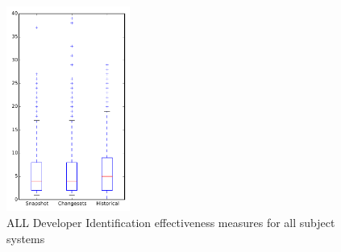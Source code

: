 
\begin{figure}[t]
\centering
\includegraphics[width=0.36\textwidth]{figures/dit/all_overview}
\caption{ALL Developer Identification effectiveness measures for all subject systems}
\label{fig:dit:all:overview}
\end{figure}
